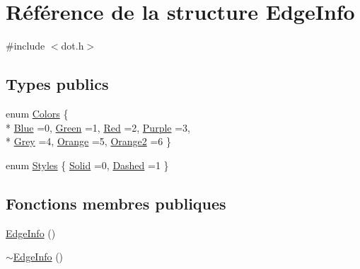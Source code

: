 \hypertarget{struct_edge_info}{}\section{Référence de la structure Edge\+Info}
\label{struct_edge_info}


{\ttfamily \#include $<$dot.\+h$>$}

\subsection*{Types publics}
\begin{DoxyCompactItemize}
\item 
enum \hyperlink{struct_edge_info_afd9f10f4693123d11e52bb1127f23228}{Colors} \{ \\*
\hyperlink{struct_edge_info_afd9f10f4693123d11e52bb1127f23228ad86037d0f4029916bab272b972da808e}{Blue} =0, 
\hyperlink{struct_edge_info_afd9f10f4693123d11e52bb1127f23228a4a29d1be23ca8384e036227c0d375949}{Green} =1, 
\hyperlink{struct_edge_info_afd9f10f4693123d11e52bb1127f23228ac4f6ba2f7702235368f07ff81f6b0c74}{Red} =2, 
\hyperlink{struct_edge_info_afd9f10f4693123d11e52bb1127f23228a4f78453f5006dccb5ecea6bd6ae41a98}{Purple} =3, 
\\*
\hyperlink{struct_edge_info_afd9f10f4693123d11e52bb1127f23228aa5653e1b61f6d5bf0b762fa8887aaec6}{Grey} =4, 
\hyperlink{struct_edge_info_afd9f10f4693123d11e52bb1127f23228a5dd85875507d2ff6d9aa5ae31ac0ae02}{Orange} =5, 
\hyperlink{struct_edge_info_afd9f10f4693123d11e52bb1127f23228a546d073d42055e46bd7922bb551ca3d3}{Orange2} =6
 \}
\item 
enum \hyperlink{struct_edge_info_a4fe2d2921d0f51d84da1bf48b3b4f2c5}{Styles} \{ \hyperlink{struct_edge_info_a4fe2d2921d0f51d84da1bf48b3b4f2c5a26f6a09cd44415e9be80ccabf5195989}{Solid} =0, 
\hyperlink{struct_edge_info_a4fe2d2921d0f51d84da1bf48b3b4f2c5a96c6ed866d802acef7582691e8230b63}{Dashed} =1
 \}
\end{DoxyCompactItemize}
\subsection*{Fonctions membres publiques}
\begin{DoxyCompactItemize}
\item 
\hyperlink{struct_edge_info_ace4f72439ec4a9937fa5fb022233e1eb}{Edge\+Info} ()
\item 
\hyperlink{struct_edge_info_ac1563ffa6c9641e5510503aa2e46f7a1}{$\sim$\+Edge\+Info} ()
\end{DoxyCompactItemize}
